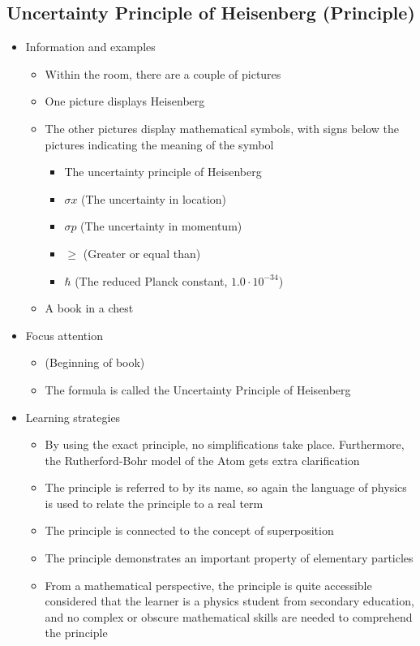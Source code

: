 \documentclass[11pt,twoside]{report} %
\begin{document}
\subsection{Uncertainty Principle of Heisenberg (Principle)}
\begin{itemize}
	\item Information and examples
	\begin{itemize}
		\item Within the room, there are a couple of pictures
		\item One picture displays Heisenberg
		\item The other pictures display mathematical symbols, with signs below the pictures indicating the meaning of the symbol
		\begin{itemize}
			\item The uncertainty principle of Heisenberg
			\item $\sigma x$ (The uncertainty in location)
			\item $\sigma p$ (The uncertainty in momentum)
			\item $\geq$ (Greater or equal than)
			\item $\hbar$ (The reduced Planck constant, $1.0 \cdot 10^{-34}$)
		\end{itemize}
		\item A book in a chest
	\end{itemize}
	\item Focus attention
	\begin{itemize}
		\item (Beginning of book)
		\item The formula is called the Uncertainty Principle of Heisenberg
	\end{itemize}
	\item Learning strategies
	\begin{itemize}
		\item By using the exact principle, no simplifications take place. Furthermore, the Rutherford-Bohr model of the Atom gets extra clarification
		\item The principle is referred to by its name, so again the language of physics is used to relate the principle to a real term
		\item The principle is connected to the concept of superposition
		\item The principle demonstrates an important property of elementary particles
		\item From a mathematical perspective, the principle is quite accessible considered that the learner is a physics student from secondary education, and no complex or obscure mathematical skills are needed to comprehend the principle

\end{itemize}
\end{itemize}
\end{document}
